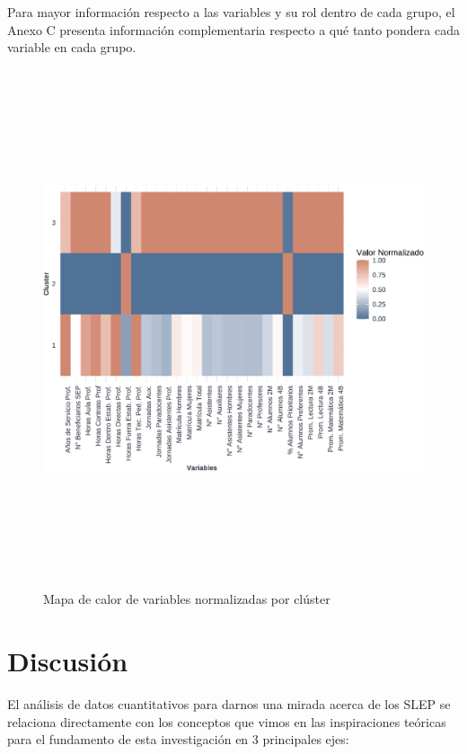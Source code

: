 \documentclass[
  12pt,
  letterpaper,
]{article}
\begin{document}
Para mayor información respecto a las variables y su rol dentro de cada grupo, el Anexo C presenta información complementaria respecto a qué tanto pondera cada variable en cada grupo.

\begin{figure}

{\centering \includegraphics[width=0.8\linewidth,height=6in]{tesis_ver_final_files/figure-latex/grafico-caract-cluster-1} 

}

\caption{Mapa de calor de variables normalizadas por clúster}\label{fig:grafico-caract-cluster}
\end{figure}

\newpage

\section{Discusión}\label{discusiuxf3n}

El análisis de datos cuantitativos para darnos una mirada acerca de los SLEP se relaciona directamente con los conceptos que vimos en las inspiraciones teóricas para el fundamento de esta investigación en 3 principales ejes:
\end{document}
